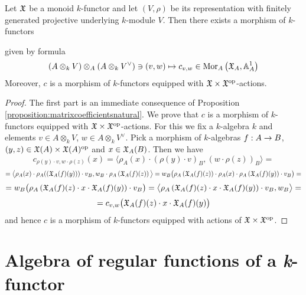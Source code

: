 \begin{corollary}\label{corollary:matrixcoefficientsnatural}
Let ${\mathfrak X}$ be a monoid $k$-functor and let $(V,\rho)$ be its representation with finitely generated projective underlying $k$-module $V$. Then there exists a morphism of $k$-functors
\begin{center}
\end{center}
given by formula
$$\left(A\otimes_kV\right)\otimes_A\left(A\otimes_kV^{\vee}\right)\ni (v,w)\mapsto c_{v,w}\in \mathrm{Mor}_A\left({\mathfrak X}_A,\mathbb{A}^1_A\right)$$
Moreover, $c$ is a morphism of $k$-functors equipped with ${\mathfrak X} \times {\mathfrak X}^{\mathrm{op}}$-actions.
\end{corollary}
\begin{proof}
The first part is an immediate consequence of Proposition \ref{proposition:matrixcoefficientsnatural}. We prove that $c$ is a morphism of $k$-functors equipped with ${\mathfrak X}\times {\mathfrak X}^{\mathrm{op}}$-actions. For this we fix a $k$-algebra $k$ and elements $v\in A\otimes_kV$, $w\in A\otimes_kV^{\vee}$. Pick a morphism of $k$-algebras $f:A\rightarrow B$, $(y,z)\in {\mathfrak X}(A)\times {\mathfrak X}(A)^{\mathrm{op}}$ and $x\in {\mathfrak X}_A(B)$. Then we have 
$$c_{\rho(y)\cdot v,w\cdot \rho(z)}(x) = \big\langle \rho_A(x)\cdot \left(\rho(y)\cdot v\right)_B, \left(w\cdot \rho(z)\right)_B \big\rangle =$$
$$= \big\langle \rho_A(x)\cdot \rho_A(\left({\mathfrak X}_A(f)(y)\right))\cdot v_B, w_B\cdot \rho_A\left({\mathfrak X}_A(f)(z)\right) \big\rangle = w_B\big(\rho_A\left({\mathfrak X}_A(f)(z)\right)\cdot \rho_A(x)\cdot \rho_A\left({\mathfrak X}_A(f)(y)\right)\cdot v_B \big)=$$
$$= w_B\big(\rho_A\left({\mathfrak X}_A(f)(z) \cdot x \cdot {\mathfrak X}_A(f)(y)\right)\cdot v_B \big) = \big\langle \rho_A\left({\mathfrak X}_A(f)(z) \cdot x \cdot {\mathfrak X}_A(f)(y)\right)\cdot v_B, w_B \big\rangle =  $$
$$= c_{v,w}\big({\mathfrak X}_A(f)(z) \cdot x \cdot {\mathfrak X}_A(f)(y)\big)$$
and hence $c$ is a morphism of $k$-functors equipped with actions of ${\mathfrak X}\times {\mathfrak X}^{\mathrm{op}}$.
\end{proof}






\section{Algebra of regular functions of a \textit{k}-functor}

